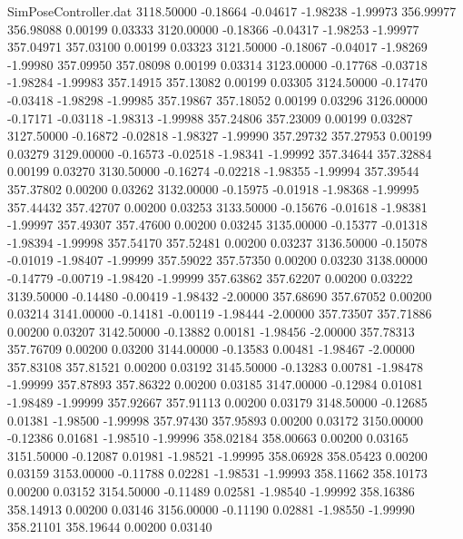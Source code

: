 \begin{filecontents}{SimPoseController.dat}
3118.50000   -0.18664   -0.04617    -1.98238   -1.99973  356.99977  356.98088    0.00199    0.03333
3120.00000   -0.18366   -0.04317    -1.98253   -1.99977  357.04971  357.03100    0.00199    0.03323
3121.50000   -0.18067   -0.04017    -1.98269   -1.99980  357.09950  357.08098    0.00199    0.03314
3123.00000   -0.17768   -0.03718    -1.98284   -1.99983  357.14915  357.13082    0.00199    0.03305
3124.50000   -0.17470   -0.03418    -1.98298   -1.99985  357.19867  357.18052    0.00199    0.03296
3126.00000   -0.17171   -0.03118    -1.98313   -1.99988  357.24806  357.23009    0.00199    0.03287
3127.50000   -0.16872   -0.02818    -1.98327   -1.99990  357.29732  357.27953    0.00199    0.03279
3129.00000   -0.16573   -0.02518    -1.98341   -1.99992  357.34644  357.32884    0.00199    0.03270
3130.50000   -0.16274   -0.02218    -1.98355   -1.99994  357.39544  357.37802    0.00200    0.03262
3132.00000   -0.15975   -0.01918    -1.98368   -1.99995  357.44432  357.42707    0.00200    0.03253
3133.50000   -0.15676   -0.01618    -1.98381   -1.99997  357.49307  357.47600    0.00200    0.03245
3135.00000   -0.15377   -0.01318    -1.98394   -1.99998  357.54170  357.52481    0.00200    0.03237
3136.50000   -0.15078   -0.01019    -1.98407   -1.99999  357.59022  357.57350    0.00200    0.03230
3138.00000   -0.14779   -0.00719    -1.98420   -1.99999  357.63862  357.62207    0.00200    0.03222
3139.50000   -0.14480   -0.00419    -1.98432   -2.00000  357.68690  357.67052    0.00200    0.03214
3141.00000   -0.14181   -0.00119    -1.98444   -2.00000  357.73507  357.71886    0.00200    0.03207
3142.50000   -0.13882    0.00181    -1.98456   -2.00000  357.78313  357.76709    0.00200    0.03200
3144.00000   -0.13583    0.00481    -1.98467   -2.00000  357.83108  357.81521    0.00200    0.03192
3145.50000   -0.13283    0.00781    -1.98478   -1.99999  357.87893  357.86322    0.00200    0.03185
3147.00000   -0.12984    0.01081    -1.98489   -1.99999  357.92667  357.91113    0.00200    0.03179
3148.50000   -0.12685    0.01381    -1.98500   -1.99998  357.97430  357.95893    0.00200    0.03172
3150.00000   -0.12386    0.01681    -1.98510   -1.99996  358.02184  358.00663    0.00200    0.03165
3151.50000   -0.12087    0.01981    -1.98521   -1.99995  358.06928  358.05423    0.00200    0.03159
3153.00000   -0.11788    0.02281    -1.98531   -1.99993  358.11662  358.10173    0.00200    0.03152
3154.50000   -0.11489    0.02581    -1.98540   -1.99992  358.16386  358.14913    0.00200    0.03146
3156.00000   -0.11190    0.02881    -1.98550   -1.99990  358.21101  358.19644    0.00200    0.03140

\end{filecontents}
